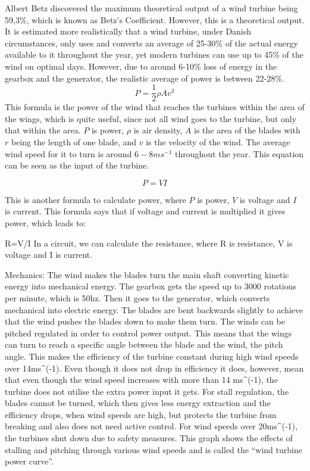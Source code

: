 \documentclass[12pt]{article}
\begin{document}
Albert Betz discovered the maximum theoretical output of a wind turbine being 59,3\%, which is known as Betz’s Coefficient.  However, this is a theoretical output. It is estimated more realistically that a wind turbine, under Danish circumstances, only uses and converts an average of 25-30\% of the actual energy available to it throughout the year, yet modern turbines can use up to 45\% of the wind on optimal days.  However, due to around 6-10\% loss of energy in the gearbox and the generator, the realistic average of power is between 22-28\%. 
\begin{equation}
P = \frac{1}{2} \rho A v^3
\label{equation:Windpower}
\end{equation}
This formula is the power of the wind that reaches the turbines within the area of the wings, which is quite useful, since not all wind goes to the turbine, but only that within the area. $P$ is power, $\rho$ is air density, $A$ is the area of the blades with $r$ being the length of one blade, and $v$ is the velocity of the wind. The average wind speed for it to turn is around $6-8 ms^{-1}$ throughout the year. This equation can be seen as the input of the turbine.


\begin{equation}

P=VI
\label{equation:Power}
\end{equation}


This is another formula to calculate power, where $P$ is power, $V$ is voltage and $I$ is current. This formula says that if voltage and current is multiplied it gives power, which leads to:

R=V/I
In a circuit, we can calculate the resistance, where R is resistance, V is voltage and I is current.

Mechanics:
The wind makes the blades turn the main shaft converting kinetic energy into mechanical energy. The gearbox gets the speed up to 3000 rotations per minute, which is 50hz. Then it goes to the generator, which converts mechanical into electric energy.
The blades are bent backwards slightly to achieve that the wind pushes the blades down to make them turn. 
The winds can be pitched regulated in order to control power output. This means that the wings can turn to reach a specific angle between the blade and the wind, the pitch angle. This makes the efficiency of the turbine constant during high wind speeds over 14ms^(-1). Even though it does not drop in efficiency it does, however, mean that even though the wind speed increases with more than 14 ms^(-1), the turbine does not utilise the extra power input it gets. For stall regulation, the blades cannot be turned, which then gives less energy extraction and the efficiency drops, when wind speeds are high, but protects the turbine from breaking and also does not need active control. For wind speeds over 20ms^(-1), the turbines shut down due to safety measures.  
This graph shows the effects of stalling and pitching through various wind speeds and is called the “wind turbine power curve”.
\end{document}
